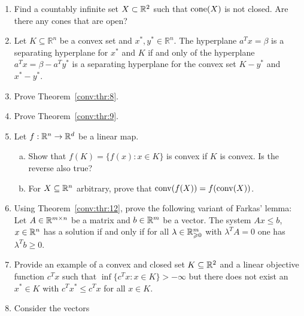\begin{enumerate}[1)]
  \emph{Hint: Use Carath\'eodory's theorem and exercise~\ref{conv:item:3}.}
\item Find a countably infinite set $X\subset\mathbb{R}^2$ such that $\mathrm{cone}(X)$ is not closed.
  Are there any cones that are open?

\item Let $K ⊆ ℝ^n$ be a convex set and $x^*, y^* ∈ ℝ^n$. The hyperplane $a^Tx = β$ is a separating hyperplane for $x^*$ and $K$ if and only of the hyperplane
  $a^Tx = β - a^T y^*$ is a separating hyperplane for the convex set $K - y^*$ and $x^* - y^*$. \label{conv:it:9} 
\item Prove Theorem~\ref{conv:thr:8}. 
\item Prove Theorem~\ref{conv:thr:9}. 
\item Let $f: \mathbb{R}^n \to \mathbb{R}^d$ be a linear map. 
  \begin{enumerate}[a)]
  \item Show that $f(K) = \{ f(x) \colon x \in K\}$  is convex if $K$ is
    convex.  Is the reverse also true? 
  \item  For $X\subseteq\mathbb{R}^n$ arbitrary, prove that $\operatorname{conv}(f(X)) = f(\operatorname{conv}(X))$.
  \end{enumerate}
\item
  \label{conv:ex:10}
  Using Theorem~\ref{conv:thr:12}, prove the following variant of Farkas' lemma:
  Let $A\in\mathbb{R}^{m\times n}$ be a matrix and $b\in\mathbb{R}^m$ be a vector.
  The system $Ax \leq b$, $x\in\mathbb{R}^n$ has a solution if and only if
  for all $\lambda\in\mathbb{R}^m_{\geqslant0}$ with $\lambda^T A = 0$ one has $\lambda^T b \geq 0$.
\item 
  \label{ex:16}
  Provide an example of a convex and closed  set $K\subseteq\mathbb{R}^2$ and a
  linear objective function $c^Tx$ such that $\inf\{c^Tx \colon
  x\in K\}>-\infty$ but there does not exist an $x^* \in K$ with $c^Tx^* \leq
  c^Tx$ for all $x \in K$. 
\item Consider the vectors

\end{enumerate}
